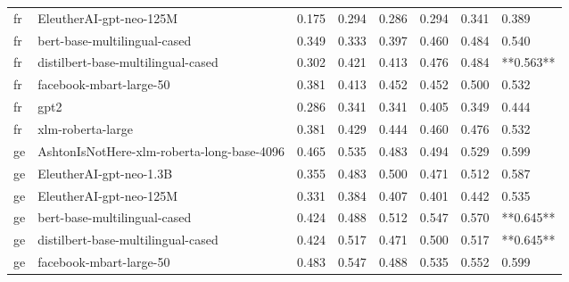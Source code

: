 \begin{tabular}{llllllll}
      fr &                    EleutherAI-gpt-neo-125M & 0.175 &                     0.294 &                 0.286 &                  0.294 &                                   0.341 &     0.389 \\
      fr &               bert-base-multilingual-cased & 0.349 &                     0.333 &                 0.397 &                  0.460 &                                   0.484 &     0.540 \\
      fr &         distilbert-base-multilingual-cased & 0.302 &                     0.421 &                 0.413 &                  0.476 &                                   0.484 & **0.563** \\
      fr &                    facebook-mbart-large-50 & 0.381 &                     0.413 &                 0.452 &                  0.452 &                                   0.500 &     0.532 \\
      fr &                                       gpt2 & 0.286 &                     0.341 &                 0.341 &                  0.405 &                                   0.349 &     0.444 \\
      fr &                          xlm-roberta-large & 0.381 &                     0.429 &                 0.444 &                  0.460 &                                   0.476 &     0.532 \\
      ge & AshtonIsNotHere-xlm-roberta-long-base-4096 & 0.465 &                     0.535 &                 0.483 &                  0.494 &                                   0.529 &     0.599 \\
      ge &                    EleutherAI-gpt-neo-1.3B & 0.355 &                     0.483 &                 0.500 &                  0.471 &                                   0.512 &     0.587 \\
      ge &                    EleutherAI-gpt-neo-125M & 0.331 &                     0.384 &                 0.407 &                  0.401 &                                   0.442 &     0.535 \\
      ge &               bert-base-multilingual-cased & 0.424 &                     0.488 &                 0.512 &                  0.547 &                                   0.570 & **0.645** \\
      ge &         distilbert-base-multilingual-cased & 0.424 &                     0.517 &                 0.471 &                  0.500 &                                   0.517 & **0.645** \\
      ge &                    facebook-mbart-large-50 & 0.483 &                     0.547 &                 0.488 &                  0.535 &                                   0.552 &     0.599 \\

\end{tabular}
